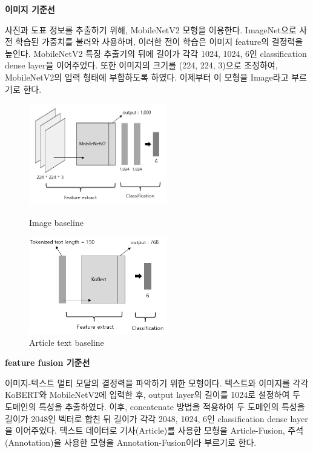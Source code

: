 \documentclass{article}
\begin{document}
\textbf{이미지 기준선}

사진과 도표 정보를 추출하기 위해, MobileNetV2 모형을 이용한다.
ImageNet으로 사전 학습된 가중치를 불러와 사용하며, 이러한 전이 학습은 이미지 feature의 결정력을 높인다.
MobileNetV2 특징 추출기의 뒤에 길이가 각각 1024, 1024, 6인 classification dense layer을 이어주었다.
또한 이미지의 크기를 (224, 224, 3)으로 조정하여, MobileNetV2의 입력 형태에 부합하도록 하였다.
이제부터 이 모형을 Image라고 부르기로 한다.


%
\begin{figure}[ht]
    \centering
    \begin{minipage}{0.48\textwidth}
        \centering
        \includegraphics[width=6cm]{ENG/image-baseline.png} %
        \caption{Image baseline}
        \label{fig.2}
        
    \end{minipage}\hfill
    \begin{minipage}{0.48\textwidth}
        \centering
        \includegraphics[width=6cm]{ENG/text-baseline.png} %
        \caption{Article text baseline}
        \label{fig.3}
    \end{minipage}
\end{figure}
%

\textbf{feature fusion 기준선}

이미지-텍스트 멀티 모달의 결정력을 파악하기 위한 모형이다.
텍스트와 이미지를 각각 KoBERT와 MobileNetV2에 입력한 후, output layer의 길이를 1024로 설정하여 두 도메인의 특성을 추출하였다.
이후, concatenate 방법을 적용하여 두 도메인의 특성을 길이가 2048인 벡터로 합친 뒤 길이가 각각 2048, 1024, 6인 classification dense layer을 이어주었다.
텍스트 데이터로 기사(Article)를 사용한 모형을 Article-Fusion, 주석(Annotation)을 사용한 모형을 Annotation-Fusion이라 부르기로 한다.
\end{document}
